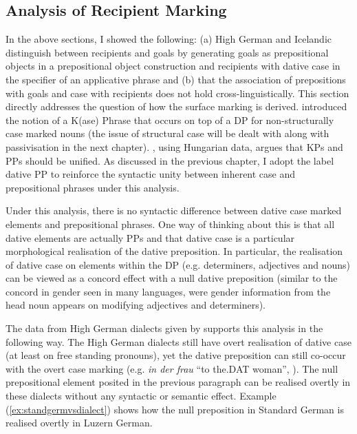 	\subsection{Analysis of Recipient Marking}
	In the above sections, I showed the following: (a) High German and Icelandic distinguish between recipients and goals by generating goals as prepositional objects in a prepositional object construction and recipients with dative case in the specifier of an applicative phrase and (b) that the association of prepositions with goals and case with recipients does not hold cross-linguistically. This section directly addresses the question of how the surface marking is derived. \cite{Bayer.2001} introduced the notion of a K(ase) Phrase that occurs on top of a DP for non-structurally case marked nouns (the issue of structural case will be dealt with along with passivisation in the next chapter). \cite{Asbury.2005}, using Hungarian data, argues that KPs and PPs should be unified. As discussed in the previous chapter, I adopt the label dative PP to reinforce the syntactic unity between inherent case and prepositional phrases under this analysis.

	Under this analysis, there is no syntactic difference between dative case marked elements and prepositional phrases. One way of thinking about this is that all dative elements are actually PPs \citep{Bittner.1996,Caha.2009,Alexiadou.2014} and that dative case is a particular morphological realisation of the dative preposition. In particular, the realisation of dative case on elements within the DP (e.g. determiners, adjectives and nouns) can be viewed as a concord effect with a null dative preposition (similar to the concord in gender seen in many languages, were gender information from the head noun appears on modifying adjectives and determiners).

	The data from High German dialects given by \cite{Seiler.2001,Seiler.2003} supports this analysis in the following way. The High German dialects still have overt realisation of dative case (at least on free standing pronouns), yet the dative preposition can still co-occur with the overt case marking (e.g. \textit{in der frau} ``to the.DAT woman'', \citealt[ex 3]{Seiler.2001}). The null prepositional element posited in the previous paragraph can be realised overtly in these dialects without any syntactic or semantic effect. Example (\ref{ex:standgermvsdialect}) shows how the null preposition in Standard German is realised overtly in Luzern German.

